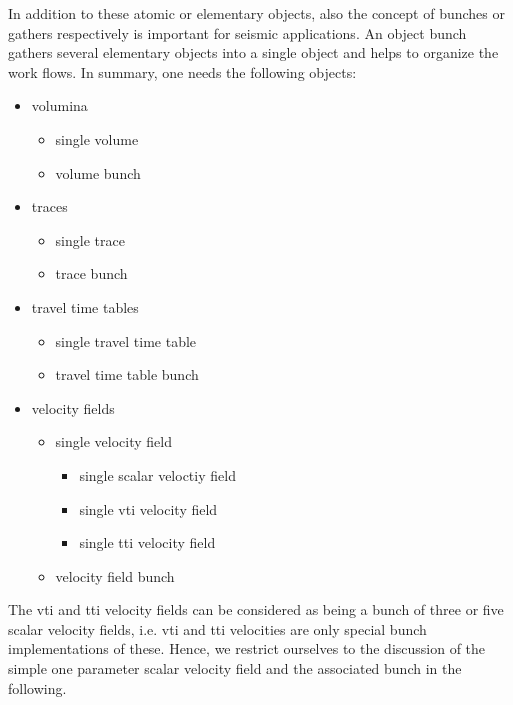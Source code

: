 \documentclass[12pt,a4paper]{article}
\begin{document}
In addition to these atomic or elementary objects, 
also the concept of bunches or gathers respectively is important for seismic applications. An
object bunch gathers several elementary objects into a single object and helps to organize
the work flows. In summary, one needs the following objects:

\begin{itemize}
\item volumina
\begin{itemize}
\item single volume
\item volume bunch
\end{itemize}
\item traces
\begin{itemize}
\item single trace
\item trace bunch
\end{itemize}
\item travel time tables
\begin{itemize}
\item single travel time table
\item travel time table bunch
\end{itemize}
\item velocity fields
\begin{itemize}
\item single velocity field
\begin{itemize}
\item single scalar veloctiy field
\item single vti velocity field
\item single tti velocity field
\end{itemize}
\item velocity field bunch
\end{itemize}
\end{itemize}
The vti and tti velocity fields can be considered as being a bunch of three or five
scalar velocity fields, i.e. vti and tti velocities are only special bunch implementations of these. 
Hence, we restrict ourselves to the discussion of the simple one parameter scalar 
velocity field and the associated bunch in the following.  
\end{document}
